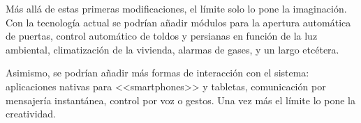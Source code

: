    Más allá de estas primeras modificaciones, el límite solo lo pone la imaginación. Con la tecnología actual se podrían añadir módulos para la apertura automática de puertas, control automático de toldos y persianas en función de la luz ambiental, climatización de la vivienda, alarmas de gases, y un largo etcétera. 
   
   Asimismo, se podrían añadir más formas de interacción con el sistema: aplicaciones nativas para <<smartphones>> y tabletas, comunicación por mensajería instantánea, control por voz o gestos. Una vez más el límite lo pone la creatividad.
   
   

\cleardoublepage
{}
\nocite{*}
\printbibliography

